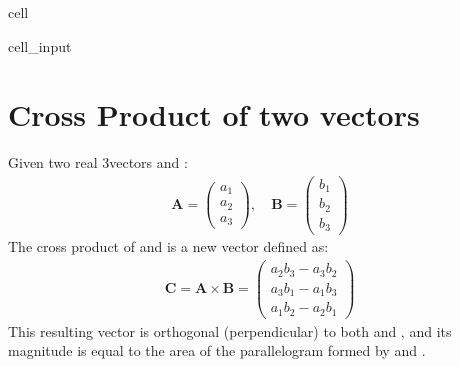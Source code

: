 \documentclass[letterpaper,10pt,english]{jupyterBook}
\begin{document}
\begin{sphinxuseclass}{cell}\begin{sphinxVerbatimInput}

\begin{sphinxuseclass}{cell_input}
\begin{sphinxVerbatim}[commandchars=\\\{\}]
    \PYG{p}{[}\PYG{p}{]}\PYG{p}{[}\PYG{p}{]}
 
\end{sphinxVerbatim}

\end{sphinxuseclass}\end{sphinxVerbatimInput}

\end{sphinxuseclass}

\section{Cross Product of two vectors}
\label{\detokenize{lessons/Matrices-student:cross-product-of-two-vectors}}
\sphinxAtStartPar
Given two real 3\sphinxhyphen{}vectors  and :
\begin{equation*}
\begin{split}
\mathbf{A} = \begin{pmatrix} a_1 \\ a_2 \\ a_3 \end{pmatrix}, \quad
\mathbf{B} = \begin{pmatrix} b_1 \\ b_2 \\ b_3 \end{pmatrix}
\end{split}
\end{equation*}
\sphinxAtStartPar
The cross product of  and  is a new vector  defined as:
\begin{equation*}
\begin{split}
\mathbf{C} = \mathbf{A} \times \mathbf{B} = \begin{pmatrix}
a_2 b_3 - a_3 b_2 \\
a_3 b_1 - a_1 b_3 \\
a_1 b_2 - a_2 b_1
\end{pmatrix}
\end{split}
\end{equation*}
\sphinxAtStartPar
This resulting vector  is orthogonal (perpendicular) to both  and , and its magnitude is equal to the area of the parallelogram formed by  and .
\end{document}
